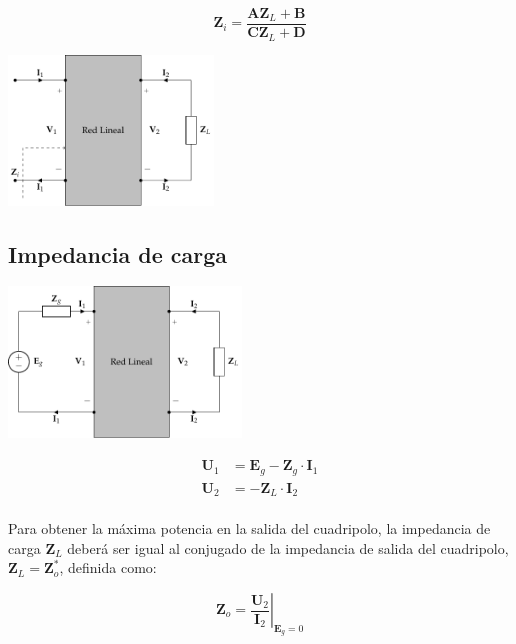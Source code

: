 \[
\mathbf{Z}_i = \frac{\mathbf{A} \mathbf{Z}_L + \mathbf{B}}{\mathbf{C}\mathbf{Z}_L + \mathbf{D}}
\]


\includegraphics[height=4cm]{../figs/cuadripolo_cargado_impedancia_entrada.pdf}




\subsection{Impedancia de carga}

\begin{minipage}{0.5\textwidth}
  
    \includegraphics[height=4cm]{../figs/cuadripolo_cargado_fuente_tension.pdf}
  
\end{minipage}
\begin{minipage}{0.5\textwidth}
  \begin{align*}
    \mathbf{U}_1 &= \mathbf{E}_g - \mathbf{Z}_g \cdot \mathbf{I}_1\\
    \mathbf{U}_2 &= - \mathbf{Z}_L \cdot \mathbf{I}_2\\
  \end{align*}
\end{minipage}

\vspace{1cm}

Para obtener la máxima potencia en la salida del cuadripolo, la impedancia de carga $\mathbf{Z}_L$ deberá ser igual al conjugado de la impedancia de salida del cuadripolo, $\mathbf{Z}_L = \mathbf{Z}^*_o$, definida como:

\[
  \mathbf{Z}_o = \left.\dfrac{\mathbf{U}_2}{\mathbf{I}_2}\right\rvert_{\mathbf{E}_g = 0}
\]

